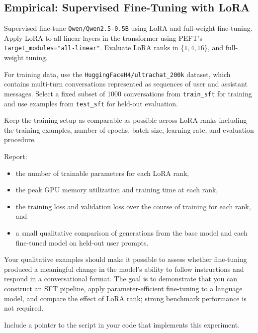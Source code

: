 \subsection{Empirical: Supervised Fine-Tuning with LoRA}

Supervised fine-tune \texttt{Qwen/Qwen2.5-0.5B} using LoRA and full-weight fine-tuning. Apply LoRA to all linear layers in the
transformer using PEFT's
\texttt{target\_modules="all-linear"}.
Evaluate LoRA ranks in $\{1,4,16\}$, and full-weight tuning.

For training data, use the
\texttt{HuggingFaceH4/ultrachat\_200k} dataset, which contains
multi-turn conversations represented as sequences of user and assistant
messages. Select a fixed subset of 1000 conversations from
\texttt{train\_sft} for training and use examples from
\texttt{test\_sft} for held-out evaluation.

Keep the training setup as comparable as possible across LoRA ranks including the training examples, number of epochs, batch size, learning rate, and evaluation procedure.

Report:
\begin{itemize}
    \item the number of trainable parameters for each LoRA rank,
    \item the peak GPU memory utilization and training time at each rank,
    \item the training loss and validation loss over the course of
    training for each rank, and
    \item a small qualitative comparison of generations from the base
    model and each fine-tuned model on held-out user prompts.
\end{itemize}

Your qualitative examples should make it possible to assess whether
fine-tuning produced a meaningful change in the model's ability to
follow instructions and respond in a conversational format.
The goal is to demonstrate that you can construct an SFT pipeline,
apply parameter-efficient fine-tuning to a language model, and compare
the effect of LoRA rank; strong benchmark performance is not required.

Include a pointer to the script in your code that implements this experiment.

